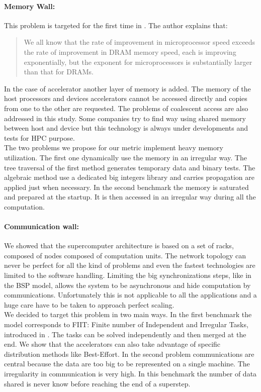 \paragraph{Memory Wall: }
This problem is targeted for the first time in \cite{wulf1995hitting}.
The author explains that:
\begin{quotation} We all know that the rate of improvement in microprocessor speed exceeds the rate of improvement in DRAM memory speed, each is improving exponentially, but the exponent for microprocessors is substantially larger than that for DRAMs.
\end{quotation}
In the case of accelerator another layer of memory is added. 
The memory of the host processors and devices accelerators cannot be accessed directly and copies from one to the other are requested.
The problems of coalescent access are also addressed in this study.
Some companies try to find way using shared memory between host and device but this technology is always under developments and tests for HPC purpose. \\

The two problems we propose for our metric implement heavy memory utilization. 
The first one dynamically use the memory in an irregular way. 
The tree traversal of the first method generates temporary data and binary tests. 
The algebraic method use a dedicated big integers library and carries propagation are applied just when necessary. 
In the second benchmark the memory is saturated and prepared at the startup.
It is then accessed in an irregular way during all the computation. 

\paragraph{Communication wall: } 
We showed that the supercomputer architecture is based on a set of racks, composed of nodes composed of computation units. 
The network topology can never be perfect for all the kind of problems and even the fastest technologies are limited to the software handling. 
Limiting the big synchronizations steps, like in the BSP model, allows the system to be asynchronous and hide computation by communications. 
Unfortunately this is not applicable to all the applications and a huge care have to be taken to approach perfect scaling.\\

We decided to target this problem in two main ways. 
In the first benchmark the model corresponds to FIIT: Finite number of Independent and Irregular Tasks, introduced in \cite{flauzac2003confiit}.
The tasks can be solved independently and then merged at the end. 
We show that the accelerators can also take advantage of specific distribution methods like Best-Effort. 
In the second problem communications are central because the data are too big to be represented on a single machine. 
The irregularity in communication is very high.
In this benchmark the number of data shared is never know before reaching the end of a superstep.

